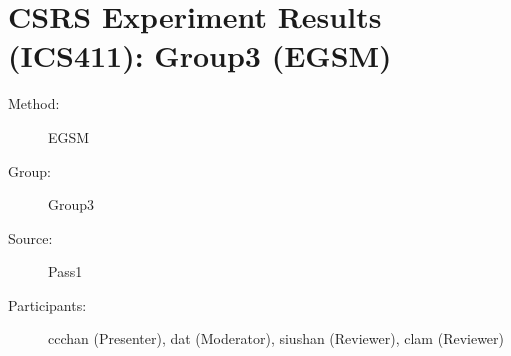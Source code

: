 \chapter {CSRS Experiment Results (ICS411): Group3 (EGSM)}
\small
	  

\begin{description}
\item [Method:] EGSM
\item [Group:] Group3
\item [Source:] Pass1
\item [Participants:] ccchan (Presenter), dat (Moderator), siushan (Reviewer), clam (Reviewer)
\end{description}

